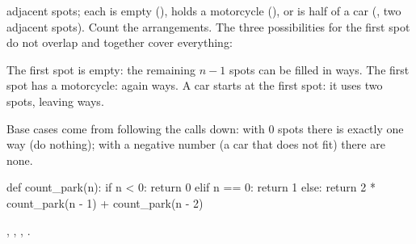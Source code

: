 \documentclass[10pt]{scrartcl}
\begin{document}
\begin{example*}
 adjacent spots; each is empty (), holds a motorcycle (\cd{\%}), or is half of a car (\cd{<>}, two adjacent spots). Count the arrangements. The three possibilities for the first spot do not overlap and together cover everything:
\begin{itemize}
  \ii The first spot is empty: the remaining $n-1$ spots can be filled in  ways.
  \ii The first spot has a motorcycle: again  ways.
  \ii A car starts at the first spot: it uses two spots, leaving  ways.
\end{itemize}
Base cases come from following the calls down: with $0$ spots there is exactly one way (do nothing); with a negative number (a car that does not fit) there are none.
\begin{py}
def count_park(n):
    if n < 0:
        return 0
    elif n == 0:
        return 1
    else:
        return 2 * count_park(n - 1) + count_park(n - 2)
\end{py}
, , , .
\end{example*}
\end{document}
